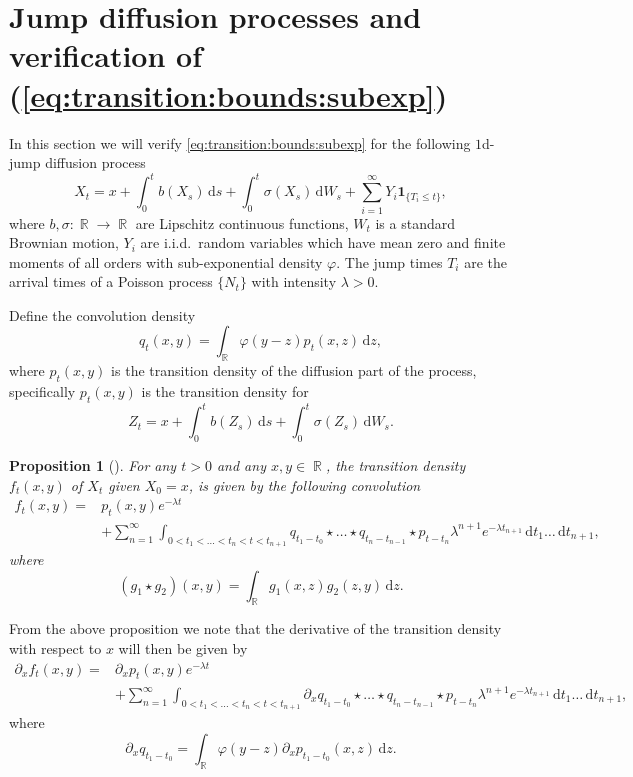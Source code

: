 \documentclass[11pt,reqno,a4paper]{amsart}
\newtheorem{proposition}[theorem]{Proposition}
\theoremstyle{definition}
\numberwithin{equation}{section}
\newcommand{\diff}{\, \mathrm{d}}
\DeclareMathOperator{\R}{\mathbb{R}}
\DeclareMathOperator{\1}{\mathbbm{1}}
\begin{document}
\section{Jump diffusion processes and verification of (\ref{eq:transition:bounds:subexp})} \label{app:3}

In this section we will verify \cref{eq:transition:bounds:subexp} for the following $1$d-jump diffusion process
\begin{equation} \label{eq:jumpdiffusion}
  X_t = x + \int_0^t b(X_s) \diff s + \int_0^t \sigma(X_s) \diff W_s + \sum_{i=1}^{\infty} Y_i \mathbf{1}_{\{T_i \leq t\}},
\end{equation}
where $b, \sigma : \R \to \R$ are Lipschitz continuous functions, $W_t$ is a standard Brownian motion, $Y_i$ are i.i.d.~random variables which have mean zero and finite moments of all orders with sub-exponential density $\varphi$. The jump times $T_i$ are the arrival times of a Poisson process $\{N_t\}$ with intensity $\lambda > 0$.

Define the convolution density
\begin{equation*}
  q_t(x,y) = \int_{\R} \varphi(y-z) p_t(x,z) \diff z,
\end{equation*}
where $p_t(x,y)$ is the transition density of the diffusion part of the process, specifically $p_t(x,y)$ is the transition density for
\begin{equation*}
  Z_t = x + \int_0^t b(Z_s) \diff s + \int_0^t \sigma(Z_s) \diff W_s.
\end{equation*}

\begin{proposition}[\cite{kohatsu2022density}]
  For any $t > 0$ and any $x,y \in \R$, the transition density $f_t(x,y)$ of $X_{t}$ given $X_0 = x$, is given by the following convolution
  \begin{align*}
    f_t(x,y) = & p_t(x,y)e^{-\lambda t}
    \\
               & +
    \sum_{n=1}^\infty \int_{0 < t_1 < \ldots < t_n < t < t_{n+1}}
    q_{t_1-t_0} \star \ldots \star q_{t_n-t_{n-1}} \star p_{t-t_n} \lambda^{n+1} e^{-\lambda t_{n+1}} \diff t_1 \ldots \diff t_{n+1},
  \end{align*}
  where
  \begin{equation*}
    (g_1 \star g_2)(x,y) = \int_{\R} g_1(x,z) g_2(z,y) \diff z.
  \end{equation*}
\end{proposition}

From the above proposition we note that the derivative of the transition density with respect to $x$ will then be given by
\begin{align*}
  \partial_x f_t(x,y) = & \partial_x p_t(x,y)e^{-\lambda t}
  \\
                        & +
  \sum_{n=1}^\infty \int_{0 < t_1 < \ldots < t_n < t < t_{n+1}}
  \partial_x q_{t_1-t_0} \star \ldots \star q_{t_n-t_{n-1}} \star p_{t-t_n} \lambda^{n+1} e^{-\lambda t_{n+1}} \diff t_1 \ldots \diff t_{n+1},
\end{align*}
where
\begin{equation*}
  \partial_x q_{t_1-t_0} = \int_{\R} \varphi(y-z) \partial_x p_{t_1-t_0}(x,z) \diff z.
\end{equation*}
\end{document}
